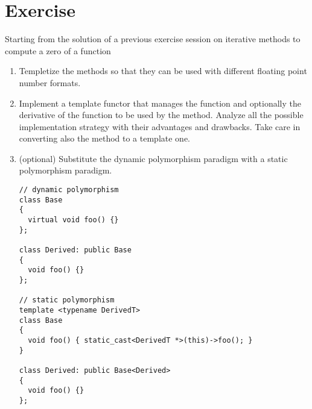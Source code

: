 \section*{Exercise}

Starting from the solution of a previous exercise session on iterative methods
to compute a zero of a function

\begin{enumerate}

  \item Templetize the methods so that they can be used with different 
  floating point number formats.
  
  \item Implement a template functor that manages the function and optionally
  the derivative of the function to be used by the method. Analyze all the
  possible implementation strategy with their advantages and drawbacks. Take
  care in converting also the  method to a template one.


  \item (optional) Substitute the dynamic polymorphism paradigm with a static polymorphism
  paradigm.
\begin{lstlisting}
// dynamic polymorphism
class Base
{
  virtual void foo() {}
};

class Derived: public Base
{
  void foo() {}
};

// static polymorphism
template <typename DerivedT>
class Base
{
  void foo() { static_cast<DerivedT *>(this)->foo(); }
}

class Derived: public Base<Derived>
{
  void foo() {}
};

\end{lstlisting}

\end{enumerate}

